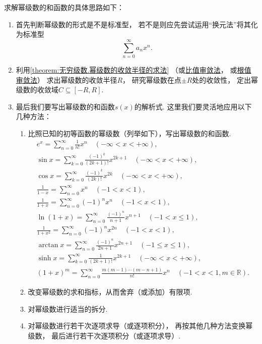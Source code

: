 求解幂级数的和函数的具体思路如下：
\begin{enumerate}
\item 首先判断幂级数的形式是不是标准型，
若不是则应先尝试运用“换元法”将其化为标准型\[
\sum\limits_{n=0}^\infty a_n x^n.
\]

\item 利用\cref{theorem:无穷级数.幂级数的收敛半径的求法}%
（或\hyperref[theorem:无穷级数.正项级数的比值审敛法]{比值审敛法}，
或\hyperref[theorem:无穷级数.正项级数的根值审敛法]{根值审敛法}）%
求出幂级数的收敛半径\(R\)，
研究幂级数在点\(\pm R\)处的收敛性，
定出幂级数的收敛域\(C\subseteq[-R,R]\).

\item 最后我们要写出幂级数的和函数\(s(x)\)的解析式.
这里我们要灵活地应用以下几种方法：
\begin{enumerate}
	\item 比照已知的初等函数的幂级数（列举如下），写出幂级数的和函数.
	\begin{gather*}
	e^x = \sum\limits_{n=0}^\infty \frac{1}{n!} x^n
		\quad(-\infty<x<+\infty), \\
	\sin x = \sum\limits_{k=0}^\infty \frac{(-1)^k}{(2k+1)!} x^{2k+1}
		\quad(-\infty<x<+\infty), \\
	\cos x = \sum\limits_{k=0}^\infty \frac{(-1)^k}{(2k)!} x^{2k}
		\quad(-\infty<x<+\infty), \\
	\frac{1}{1-x} = \sum\limits_{n=0}^\infty x^n
		\quad(-1<x<1), \\
	\frac{1}{1+x} = \sum\limits_{n=0}^\infty (-1)^n x^n
		\quad(-1<x<1), \\
	\ln(1+x) = \sum\limits_{n=0}^\infty \frac{(-1)^n}{n+1} x^{n+1}
		\quad(-1<x\leq1), \\
	\frac{1}{1+x^2} = \sum\limits_{n=0}^\infty (-1)^n x^{2n}
		\quad(-1<x<1), \\
	\arctan x = \sum\limits_{n=0}^\infty \frac{(-1)^n}{2n+1} x^{2n+1}
		\quad(-1 \leq x \leq 1), \\
	\sinh x = \sum\limits_{k=0}^\infty \frac{1}{(2k+1)!} x^{2k+1}
		\quad(-\infty<x<+\infty), \\
	(1+x)^m = \sum\limits_{n=0}^\infty \frac{m(m-1)\dotsm(m-n+1)}{n!} x^n
		\quad(-1<x<1,m\in\mathbb{R}).
	\end{gather*}

	\item 改变幂级数的求和指标，从而舍弃（或添加）有限项.

	\item 对幂级数进行适当的拆分.

	\item 对幂级数进行若干次逐项求导（或逐项积分），
	再按其他几种方法变换幂级数，
	最后进行若干次逐项积分（或逐项求导）.


\end{enumerate}
\end{enumerate}
